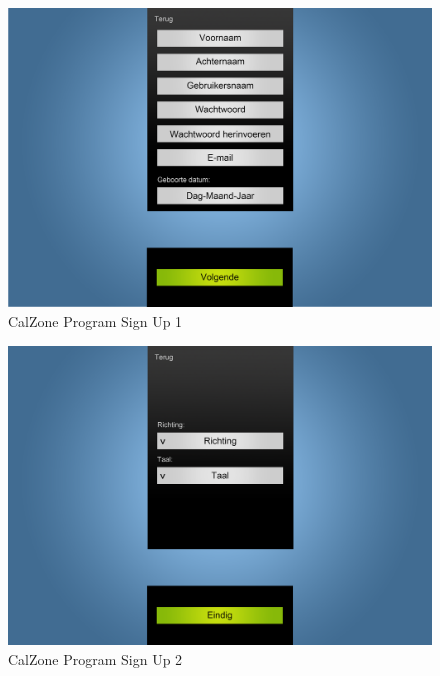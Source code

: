 \begin{center}
\begin{figure}[H]
\caption{CalZone Program Sign Up 1}
\centerline{\includegraphics[scale=0.4]{img/Calzonesignup1}}
\label{fig:CalZone Program Sign Up 1}
\end{figure}

\begin{figure}[H]
\caption{CalZone Program Sign Up 2}
\centerline{\includegraphics[scale=0.4]{img/Calzonesignup2}}
\label{fig:CalZone Program Sign Up 2}
\end{figure}

\end{center}
\clearpage
